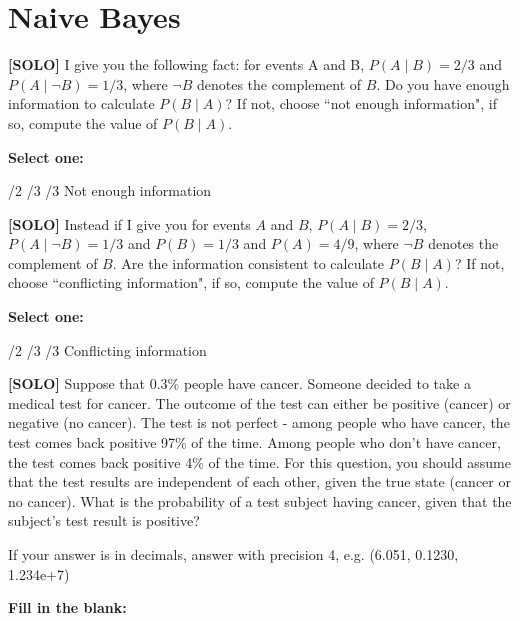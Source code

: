 \documentclass[11pt,addpoints,answers]{exam}
\newcommand{\solo}{\textbf{[SOLO]} }
\begin{document}
\section{Naive Bayes}
\begin{questions}
    \question[3] \solo I give you the following fact: for events A and B, $P(A\mid B) = 2/3$ and $P(A\mid \neg B) = 1/3$, where $\neg B$ denotes the complement of $B$. Do you have enough information to calculate $P(B\mid A)$? If not, choose ``not enough information", if so, compute the value of $P(B\mid A)$.

    \textbf{Select one:}
    \begin{checkboxes}
        /2
        /3
        /3
        \choice Not enough information
    \end{checkboxes}
    
    
    \question[3] \solo Instead if I give you for events $A$ and $B$, $P(A\mid B) = 2/3$, $P(A\mid \neg B) = 1/3$ and $P(B) = 1/3$ and $P(A) = 4/9$, where $\neg B$ denotes the complement of $B$. Are the information consistent to calculate $P(B\mid A)$? If not, choose ``conflicting information", if so, compute the value of $P(B\mid A)$.

    \textbf{Select one:}
    \begin{checkboxes}
        /2
        /3
        /3
        \choice Conflicting information
    \end{checkboxes}
    
    
    \question[4] \solo Suppose that 0.3$\%$ people have cancer. Someone decided to take a medical test for cancer. The outcome of the test can either be positive (cancer) or negative (no cancer). The test is not perfect - among people who have cancer, the test comes back positive 97\% of the time. Among people who don’t have cancer, the test comes back positive 4\% of the time. For this question, you should assume that the test results are independent of each other, given the true state (cancer or no cancer). What is the probability of a test subject having cancer, given that the subject’s test result is positive?
    
    If your answer is in decimals, answer with precision 4, e.g. (6.051, 0.1230, 1.234e+7)

    \textbf{Fill in the blank:}
    
    \begin{tcolorbox}[fit,height=1cm, width=4cm, blank, borderline={1pt}{-2pt},nobeforeafter]
    

\end{tcolorbox}
\end{questions}
\end{document}
